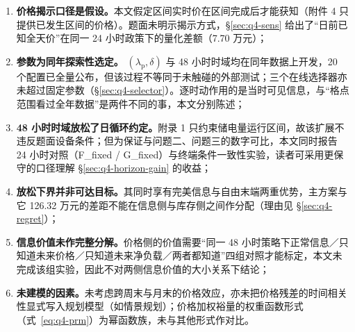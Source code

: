 \begin{enumerate}
  \item \textbf{价格揭示口径是假设。}本文假定区间实时价在区间完成后才能获知（附件 4 只提供已发生区间的价格）。题面未明示揭示方式，\S\ref{sec:q4-sens} 给出了``日前已知全天价''在同一 24 小时政策下的量化差额（7.70 万元）；
  \item \textbf{参数为同年探索性选定。} $(\lambda_{\mathrm{p}},\delta)$ 与 48 小时时域均在同年数据上开发，20 个配置已全量公布，但该过程不等同于未触碰的外部测试；三个在线选择器亦未超过固定参数（\S\ref{sec:q4-selector}）。逐时动作用的是当时可见信息，与``格点范围看过全年数据''是两件不同的事，本文分别陈述；
  \item \textbf{48 小时时域放松了日循环约定。}附录 1 只约束储电量运行区间，故该扩展不违反题面设备条件；但为保证与问题二、问题三的数字可比，本文同时报告 24 小时对照（F\_fixed / G\_fixed）与终端条件一致性实验，读者可采用更保守的口径理解 \S\ref{sec:q4-horizon-gain} 的收益；
  \item \textbf{放松下界并非可达目标。}其同时享有完美信息与自由末端两重优势，主方案与它 126.32 万元的差距不能在信息侧与库存侧之间作分配（理由见 \S\ref{sec:q4-regret}）；
  \item \textbf{信息价值未作完整分解。}价格侧的价值需要``同一 48 小时策略下正常信息／只知道未来价格／只知道未来净负载／两者都知道''四组对照才能标定，本文未完成该组实验，因此不对两侧信息价值的大小关系下结论；
  \item \textbf{未建模的因素。}未考虑跨周末与月末的价格效应，亦未把价格残差的时间相关性显式写入规划模型（如情景规划）；价格加权裕量的权重函数形式（式~\eqref{eq:q4-prm}）为幂函数族，未与其他形式作对比。
\end{enumerate}
